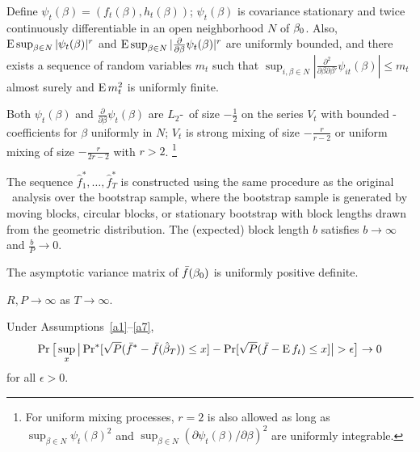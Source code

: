 \documentclass[12pt,fleqn]{article}
\begin{document}
\begin{asmp}\label{a2}
  Define $\psi_t(\beta) = (f_t(\beta), h_t(\beta))$; $\psi_t(\beta)$
  is covariance stationary and twice continuously differentiable in an
  open neighborhood $N$ of $\btrue$.  Also, $\operatorname{E} \sup_{\beta \in N}
  |\psi_t(\beta)|^r$ and $\operatorname{E}\sup_{\beta \in N}
  |\frac{\partial}{\partial \beta} \psi_t(\beta)|^r$ are uniformly
  bounded, and there exists a sequence of random variables $m_t$ such
  that $\sup_{i,\beta \in N} |\tfrac{\partial^2}{\partial
    \beta \partial \beta'} \psi_{it}(\beta)| \leq m_t$ almost surely
  and $\operatorname{E} m_t^2$ is uniformly finite.
\end{asmp}

\begin{asmp}\label{a3}
  Both $\psi_t(\beta)$ and $\frac{\partial}{\partial \beta}
  \psi_t(\beta)$ are $L_2$-\ned\ of size $-\frac12$ on the series
  $V_t$ with bounded \ned-coefficients for $\beta$ uniformly in $N$;
  $V_t$ is strong mixing of size $-\frac{r}{r-2}$ or uniform mixing of
  size $-\frac{r}{2r-2}$ with $r > 2$.%
  \footnote{For uniform mixing processes, $r = 2$ is also allowed as
    long as $\sup_{\beta \in N} \psi_t(\beta)^2$ and $\sup_{\beta \in
      N} (\partial \psi_t(\beta) / \partial \beta)^2$ are uniformly
    integrable.} %
\end{asmp}

\begin{asmp}\label{a4}
  The sequence $\hat f_1^{*},\dots,\hat f_T^{*}$ is constructed using
  the same procedure as the original \oos\ analysis over the bootstrap
  sample, where the bootstrap sample is generated by moving blocks,
  circular blocks, or stationary bootstrap with block lengths drawn
  from the geometric distribution.  The (expected) block length $b$
  satisfies $b \to \infty$ and $\frac{b}{P} \to 0$.
\end{asmp}

\begin{asmp}\label{a5}
\end{asmp}

\begin{asmp}\label{a6}
  The asymptotic variance matrix of $\bar{f}(\btrue)$ is uniformly
  positive definite.
\end{asmp}

\begin{asmp}\label{a7}
  $R, P \to \infty$ as $T \to \infty$.
\end{asmp}

\begin{thm}\label{res:3}
  Under Assumptions~\ref{a1}--\ref{a7},
  \begin{equation}
    \pr\big[\sup_x \big\lvert \pr^*[\sqrt{P} (\bar{f}^* - \bar{f}(\btrue[*])) \leq x]
    - \pr[\sqrt{P}( \bar{f} - \E f_t) \leq x] \big\rvert > \epsilon\big] \to 0
  \end{equation}
  for all $\epsilon > 0$.
\end{thm}
\end{document}
